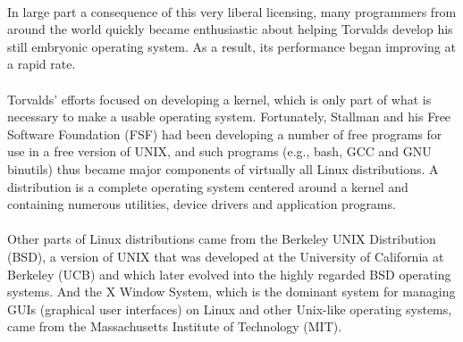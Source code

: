 \documentclass[11pt]{article}
\begin{document}
\\
In large part a consequence of this very liberal licensing, many programmers from around the world quickly became enthusiastic about helping Torvalds develop his still embryonic operating system. As a result, its performance began improving at a rapid rate.\\
\\
Torvalds' efforts focused on developing a kernel, which is only part of what is necessary to make a usable operating system. Fortunately, Stallman and his Free Software Foundation (FSF) had been developing a number of free programs for use in a free version of UNIX, and such programs (e.g., bash, GCC and GNU binutils) thus became major components of virtually all Linux distributions. A distribution is a complete operating system centered around a kernel and containing numerous utilities, device drivers and application programs.\\
\\
Other parts of Linux distributions came from the Berkeley UNIX Distribution (BSD), a version of UNIX that was developed at the University of California at Berkeley (UCB) and which later evolved into the highly regarded BSD operating systems. And the X Window System, which is the dominant system for managing GUIs (graphical user interfaces) on Linux and other Unix-like operating systems, came from the Massachusetts Institute of Technology (MIT).
\end{document}
